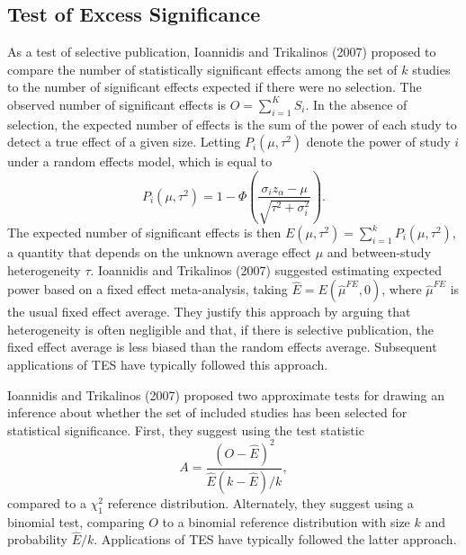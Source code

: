 \documentclass[man,floatsintext]{apa6}
\begin{document}
\hypertarget{test-of-excess-significance}{%
\subsection{Test of Excess Significance}\label{test-of-excess-significance}}

As a test of selective publication, Ioannidis and Trikalinos (2007) proposed to compare the number of statistically significant effects among the set of \(k\) studies to the number of significant effects expected if there were no selection.
The observed number of significant effects is \(O = \sum_{i=1}^K S_i\).
In the absence of selection, the expected number of effects is the sum of the power of each study to detect a true effect of a given size.
Letting \(P_i(\mu,\tau^2)\) denote the power of study \(i\) under a random effects model, which is equal to
\begin{equation} 
P_i(\mu,\tau^2) = 1 - \Phi\left( \frac{\sigma_i z_\alpha - \mu}{\sqrt{\tau^2 + \sigma_i^2}}\right).
\label{eq:power}
\end{equation}
The expected number of significant effects is then \(E(\mu, \tau^2) = \sum_{i=1}^k P_i(\mu, \tau^2)\), a quantity that depends on the unknown average effect \(\mu\) and between-study heterogeneity \(\tau\).
Ioannidis and Trikalinos (2007) suggested estimating expected power based on a fixed effect meta-analysis, taking \(\hat{E} = E(\hat\mu^{FE}, 0)\), where \(\hat\mu^{FE}\) is the usual fixed effect average.
They justify this approach by arguing that heterogeneity is often negligible and that, if there is selective publication, the fixed effect average is less biased than the random effects average.
Subsequent applications of TES have typically followed this approach.

Ioannidis and Trikalinos (2007) proposed two approximate tests for drawing an inference about whether the set of included studies has been selected for statistical significance. First, they suggest using the test statistic
\begin{equation}
A = \frac{(O - \hat{E})^2}{\hat{E}(k - \hat{E}) / k},
\label{eq:chisq-stat}
\end{equation}
compared to a \(\chi^2_1\) reference distribution.
Alternately, they suggest using a binomial test, comparing \(O\) to a binomial reference distribution with size \(k\) and probability \(\hat{E} / k\).
Applications of TES have typically followed the latter approach.
\end{document}
